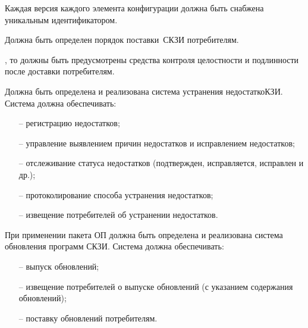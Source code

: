 \label{R.LC.CMVersion} %
Каждая версия каждого элемента конфигурации 
должна быть снабжена уникальным идентификатором. 

\label{R.LC.Delivery} %
Должна быть определен порядок поставки~СКЗИ потребителям.  

\label{R.LC.Authenticode} %
,
то должны быть предусмотрены средства контроля  целостности и 
подлинности после доставки потребителям.

\label{R.LC.FlawRemediation} %
Должна быть определена и реализована система устранения 
недостаткоКЗИ.
%
Система должна обеспечивать:
\begin{itemize}
\item[--]
регистрацию недостатков;
\item[--]
управление выявлением причин недостатков и исправлением недостатков;
\item[--]
отслеживание статуса недостатков 
(подтвержден, исправляется, исправлен и др.);
\item[--]
протоколирование способа устранения недостатков;
\item[--]
извещение потребителей об устранении недостатков.
\end{itemize}

\label{R.LC.SU} %
При применении пакета ОП должна быть определена и реализована система 
обновления программ СКЗИ. 
%
Система должна обеспечивать:
\begin{itemize}
\item[--]
выпуск обновлений;
\item[--]
извещение потребителей о выпуске обновлений (с указанием содержания 
обновлений);  
\item[--]
поставку обновлений потребителям.
\end{itemize}

